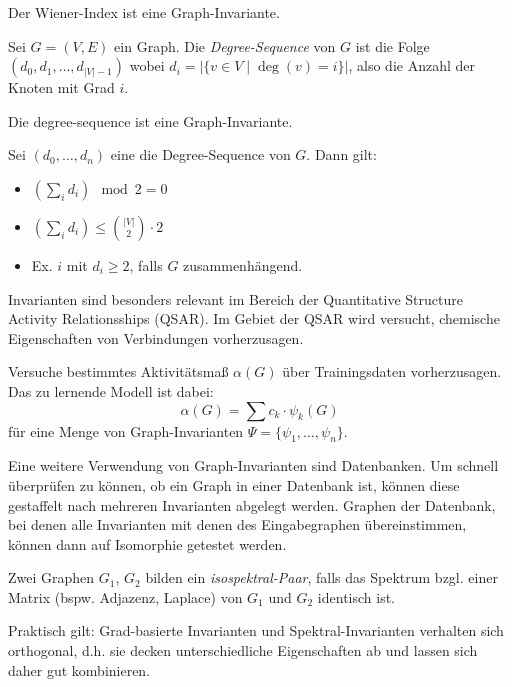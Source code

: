 \begin{proposition}
    Der Wiener-Index ist eine Graph-Invariante.
\end{proposition}

\begin{definition}
    Sei $ G = (V, E) $ ein Graph.
    Die \textit{Degree-Sequence} von $ G $ ist die Folge $ (d_0, d_1, \dots, d_{|V| - 1}) $ wobei $ d_i = |\{ v \in V \mid \deg(v) = i \}| $, also die Anzahl der Knoten mit Grad $ i $.
\end{definition}

\begin{proposition}
    Die degree-sequence ist eine Graph-Invariante.
\end{proposition}

\begin{proposition}
    Sei $ (d_0, \dots, d_n) $ eine die Degree-Sequence von $ G $.
    Dann gilt:
    \begin{itemize}
        \item $ (\sum_i d_i) \mod 2 = 0 $
        \item $ (\sum_i d_i) \leq \binom{|V|}{2} \cdot 2 $
        \item Ex. $ i $ mit $ d_i \geq 2 $, falls $ G $ zusammenhängend.
    \end{itemize}
\end{proposition}

\begin{example}
    Invarianten sind besonders relevant im Bereich der Quantitative Structure Activity Relationsships (QSAR).
    Im Gebiet der QSAR wird versucht, chemische Eigenschaften von Verbindungen vorherzusagen.

    Versuche bestimmtes Aktivitätsmaß $ \alpha(G) $ über Trainingsdaten vorherzusagen.
    Das zu lernende Modell ist dabei:
    \begin{equation*}
        \alpha(G) = \sum c_k \cdot \psi_k(G)
    \end{equation*}
    für eine Menge von Graph-Invarianten $ \Psi = \{ \psi_1, \dots, \psi_n \} $.
\end{example}

\begin{example}
    Eine weitere Verwendung von Graph-Invarianten sind Datenbanken.
    Um schnell überprüfen zu können, ob ein Graph in einer Datenbank ist, können diese gestaffelt nach mehreren Invarianten abgelegt werden.
    Graphen der Datenbank, bei denen alle Invarianten mit denen des Eingabegraphen übereinstimmen, können dann auf Isomorphie getestet werden.
\end{example}

\begin{definition}
    Zwei Graphen $ G_1 $, $ G_2 $ bilden ein \textit{isospektral-Paar}, falls das Spektrum bzgl. einer Matrix (bspw. Adjazenz, Laplace) von $ G_1 $ und $ G_2 $ identisch ist.
\end{definition}

\begin{remark}
    Praktisch gilt: Grad-basierte Invarianten und Spektral-Invarianten verhalten sich orthogonal, d.h. sie decken unterschiedliche Eigenschaften ab und lassen sich daher gut kombinieren.
\end{remark}

